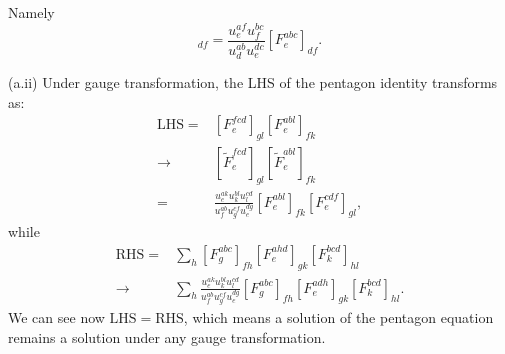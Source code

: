 \documentclass{book}
\begin{document}
Namely
\begin{equation*}
[\tilde{F}_{e}^{abc} ]_{df} =\frac{u_{e}^{af} u_{f}^{bc}}{u_{d}^{ab} u_{e}^{dc}} [F_{e}^{abc} ]_{df} .
\end{equation*}

(a.ii) Under gauge transformation, the LHS of the pentagon identity transforms as:
\begin{equation*}
\begin{aligned}
\mathrm{LHS} = & [F_{e}^{fcd} ]_{gl} [F_{e}^{abl} ]_{fk}\\
\rightarrow  & [\tilde{F}_{e}^{fcd} ]_{gl} [\tilde{F}_{e}^{abl} ]_{fk}\\
= & \frac{u_{e}^{ak} u_{k}^{bl} u_{l}^{cd}}{u_{f}^{ab} u_{g}^{cf} u_{e}^{dg}} [F_{e}^{abl} ]_{fk} [F_{e}^{cdf} ]_{gl} ,
\end{aligned}
\end{equation*}
while
\begin{equation*}
\begin{aligned}
\mathrm{RHS} = & \sum _{h} [F_{g}^{abc} ]_{fh} [F_{e}^{ahd} ]_{gk} [F_{k}^{bcd} ]_{hl}\\
\rightarrow  & \sum _{h}\frac{u_{e}^{ak} u_{k}^{bl} u_{l}^{cd}}{u_{f}^{ab} u_{g}^{cf} u_{e}^{dg}} [F_{g}^{abc} ]_{fh} [F_{e}^{adh} ]_{gk} [F_{k}^{bcd} ]_{hl} .
\end{aligned}
\end{equation*}
We can see now $\mathrm{LHS} =\mathrm{RHS}$, which means a solution of the pentagon equation remains a solution under any gauge transformation.
\end{document}
